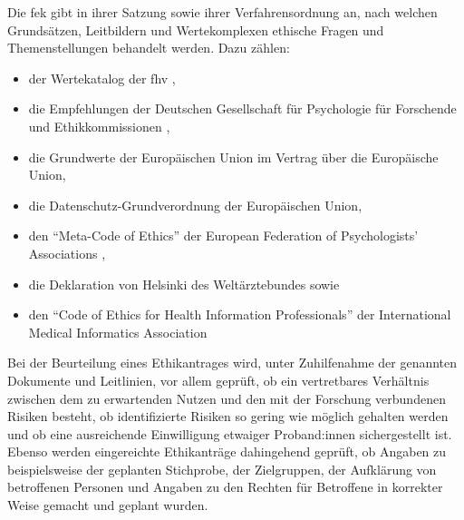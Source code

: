 \documentclass[a4paper,12pt,twoside]{scrreprt}
\begin{document}
Die \ac{fek} gibt in ihrer Satzung \cite[1]{forschungsethik-kommission_der_fachhochschule_vorarlberg_satzung_2021} sowie ihrer Verfahrensordnung \cite[1\psq]{forschungsethik-kommission_der_fachhochschule_vorarlberg_verfahrensordnung_2020} an, nach welchen Grundsätzen, Leitbildern und Wertekomplexen ethische Fragen und Themenstellungen behandelt werden. Dazu zählen:
\begin{itemize}
    \item der Wertekatalog der \acl{fhv} \cite{kollegium_der_fachhochschule_vorarlberg_gmbh_wertekatalog_2022},
    \item die Empfehlungen der Deutschen Gesellschaft für Psychologie für Forschende und Ethikkommissionen \cite{deutsche_gesellschaft_fur_psychologie_ev_ethisches_2018},
    \item die Grundwerte der Europäischen Union im Vertrag über die Europäische Union,
    \item die Datenschutz-Grundverordnung der Europäischen Union,
    \item den \enquote{Meta-Code of Ethics} der European Federation of Psychologists' Associations \cite{european_federation_of_psychologists_associations_meta-code_2005},
    \item die Deklaration von Helsinki des Weltärztebundes \cite{world_medical_association_world_2013} sowie
    \item den \enquote{Code of Ethics for Health Information Professionals} der International Medical Informatics Association \cite{international_medical_informatics_association_imia_2016}
\end{itemize}

Bei der Beurteilung eines Ethikantrages wird, unter Zuhilfenahme der genannten Dokumente und Leitlinien, vor allem geprüft, ob ein vertretbares Verhältnis zwischen dem zu erwartenden Nutzen und den mit der Forschung verbundenen Risiken besteht, ob identifizierte Risiken so gering wie möglich gehalten werden und ob eine ausreichende Einwilligung etwaiger Proband:innen sichergestellt ist. Ebenso werden eingereichte Ethikanträge dahingehend geprüft, ob Angaben zu beispielsweise der geplanten Stichprobe, der Zielgruppen, der Aufklärung von betroffenen Personen und Angaben zu den Rechten für Betroffene in korrekter Weise gemacht und geplant wurden. \cite[1\psq]{forschungsethik-kommission_der_fachhochschule_vorarlberg_verfahrensordnung_2020}
\end{document}

